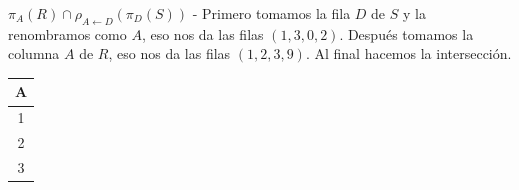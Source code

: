 \item $\pi_A (R) \cap \rho_{A \leftarrow D} (\pi_D (S))$ - Primero tomamos la fila $D$ de $S$ y la renombramos como $A$, eso nos da las filas $(1,3,0,2)$. Después tomamos la columna $A$ de $R$, eso nos da las filas $(1,2,3,9)$. Al final hacemos la intersección.

\begin{center}
\begin{tabular}{c}
\toprule
\textbf{A} \\
\midrule
1 \\
2 \\
3 \\
\bottomrule
\end{tabular}
\end{center}
